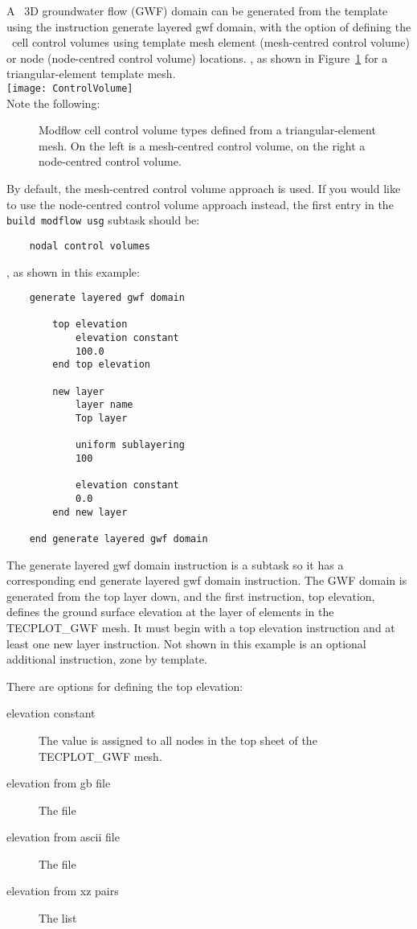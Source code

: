 \label{texfile:GWF}
A \mfus\ 3D groundwater flow (GWF) domain can be generated from the template using the
instruction \textsf{generate layered gwf domain}, with the option of defining the \mf\ cell control volumes using template mesh element (mesh-centred  control volume) or node (node-centred control volume) locations.  , as shown in Figure~\ref{fig:ControlVolumes} for a triangular-element template mesh.
    \vspace{.2in} \\
   \texttt{[image: ControlVolume]}
    \vspace{.2in} \\
Note the following:
\begin{figure}
     \caption{Modflow cell control volume types defined from a triangular-element mesh.  On the left is a mesh-centred control volume, on the right a node-centred control volume.}
    \label{fig:ControlVolumes}
\end{figure}
By default, the mesh-centred  control volume approach is used. If you would like to use the node-centred control volume approach instead, the first entry in the \texttt{build modflow usg} subtask should be:
\begin{verbatim}
    nodal control volumes
\end{verbatim}





, as shown in this example:
\begin{verbatim}
    generate layered gwf domain

        top elevation
            elevation constant
            100.0
        end top elevation

        new layer
            layer name
            Top layer

            uniform sublayering
            100

            elevation constant
            0.0
        end new layer

    end generate layered gwf domain
\end{verbatim}
The \textsf{generate layered gwf domain} instruction is a subtask so it has a corresponding \textsf{end generate layered gwf domain} instruction.  The GWF domain is generated from the top layer down, and the first instruction, \textsf{top elevation}, defines the ground surface elevation at the layer of elements in the TECPLOT\_GWF mesh. It must begin with a \textsf{top elevation} instruction and at least one \textsf{new layer} instruction. Not shown in this example is an optional additional instruction, \textsf{zone by template}.

 There are options for defining the top elevation:
\begin{description}
  \item[elevation constant] The value is assigned to all nodes in the top sheet of the TECPLOT\_GWF mesh.
  \item[elevation from gb file] The file
  \item[elevation from ascii file] The file
  \item[elevation from xz pairs] The list

\end{description}
